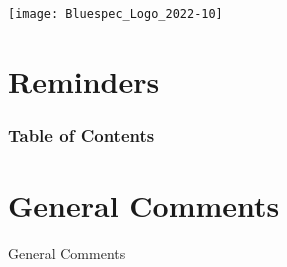


\date{L18: RISC-V: Optimizing Drum and Fife}





\begin{frame}
\titlepage

\begin{center}
 \texttt{[image: Bluespec\_Logo\_2022-10]}
\end{center}

\end{frame}


\section{Reminders}




\begin{frame}
\frametitle{Table of Contents}

\tableofcontents

\end{frame}


\section{General Comments}

\begin{frame}

\begin{center}
  {\LARGE General Comments}
\end{center}

\end{frame}


